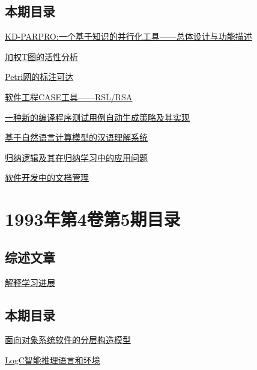 \documentclass[a4paper]{article}
\begin{document}
\subsection{本期目录}
\href{http://www.jos.org.cn/ch/reader/download_pdf.aspx?file_no=19930601&year_id=1993&quarter_id=6&falg=1}{KD-PARPRO:一个基于知识的并行化工具——总体设计与功能描述}

\href{http://www.jos.org.cn/ch/reader/download_pdf.aspx?file_no=19930603&year_id=1993&quarter_id=6&falg=1}{加权T图的活性分析}

\href{http://www.jos.org.cn/ch/reader/download_pdf.aspx?file_no=19930604&year_id=1993&quarter_id=6&falg=1}{Petri网的标注可达}

\href{http://www.jos.org.cn/ch/reader/download_pdf.aspx?file_no=19930605&year_id=1993&quarter_id=6&falg=1}{软件工程CASE工具——RSL/RSA}

\href{http://www.jos.org.cn/ch/reader/download_pdf.aspx?file_no=19930606&year_id=1993&quarter_id=6&falg=1}{一种新的编译程序测试用例自动生成策略及其实现}

\href{http://www.jos.org.cn/ch/reader/download_pdf.aspx?file_no=19930607&year_id=1993&quarter_id=6&falg=1}{基于自然语言计算模型的汉语理解系统}

\href{http://www.jos.org.cn/ch/reader/download_pdf.aspx?file_no=19930608&year_id=1993&quarter_id=6&falg=1}{归纳逻辑及其在归纳学习中的应用问题}

\href{http://www.jos.org.cn/ch/reader/download_pdf.aspx?file_no=19930609&year_id=1993&quarter_id=6&falg=1}{软件开发中的文档管理}


\section{\textbf{1993年第4卷第5期目录}}
\subsection{综述文章}
\href{http://www.jos.org.cn/ch/reader/download_pdf.aspx?file_no=19930508&year_id=1993&quarter_id=5&falg=1}{解释学习进展}

\subsection{本期目录}
\href{http://www.jos.org.cn/ch/reader/download_pdf.aspx?file_no=19930501&year_id=1993&quarter_id=5&falg=1}{面向对象系统软件的分层构造模型}

\href{http://www.jos.org.cn/ch/reader/download_pdf.aspx?file_no=19930502&year_id=1993&quarter_id=5&falg=1}{LogC智能推理语言和环境}
\end{document}
